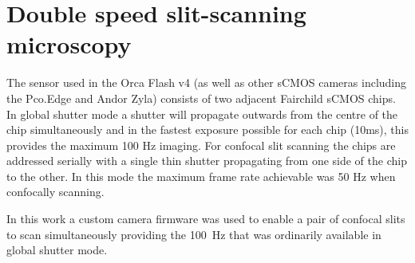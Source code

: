 


\section{Double speed slit-scanning microscopy}

The sensor used in the Orca Flash v4 (as well as other sCMOS cameras including the Pco.Edge and Andor Zyla) consists of two adjacent Fairchild sCMOS chips.
In global shutter mode a shutter will propagate outwards from the centre of the chip simultaneously and in the fastest exposure possible for each chip (10ms), this provides the maximum 100 Hz imaging.
For confocal slit scanning the chips are addressed serially with a single thin shutter propagating from one side of the chip to the other.
In this mode the maximum frame rate achievable was 50 Hz when confocally scanning.

In this work a custom camera firmware was used to enable a pair of confocal slits to scan simultaneously providing the \SI{100}{\hertz} that was ordinarily available in global shutter mode.

